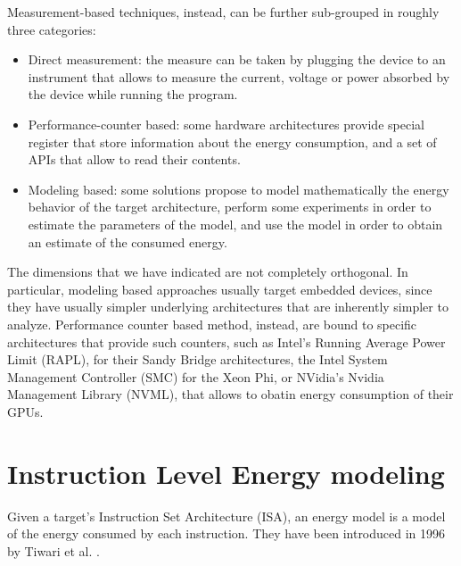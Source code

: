Measurement-based techniques, instead, can be further sub-grouped in roughly three categories:
\begin{itemize}
\item Direct measurement: the measure can be taken by plugging the device to an instrument that allows to measure the current, voltage or power absorbed by the device while running the program.
\item Performance-counter based: some hardware architectures provide special register that store information about the energy consumption, and a set of APIs that allow to read their contents.
\item Modeling based: some solutions propose to model mathematically the energy behavior of the target architecture, perform some experiments in order to estimate the parameters of the model, and use the model in order to obtain an estimate of the consumed energy.
\end{itemize} 
\par The dimensions that we have indicated are not completely orthogonal. In particular, modeling based approaches usually target embedded devices, since they have usually simpler underlying architectures that are inherently simpler to analyze. \newline Performance counter based method, instead, are bound to specific architectures that provide such counters, such as Intel's Running Average Power Limit (RAPL), for their Sandy Bridge architectures, the Intel System Management Controller (SMC) for the Xeon Phi, or NVidia's Nvidia Management Library (NVML), that allows to obatin energy consumption of their GPUs.

\section{Instruction Level Energy modeling}
Given a target's Instruction Set Architecture (ISA), an energy model is a model of the energy consumed by each instruction.
They have been introduced in 1996 by Tiwari et al. \cite{tiwari}. 
